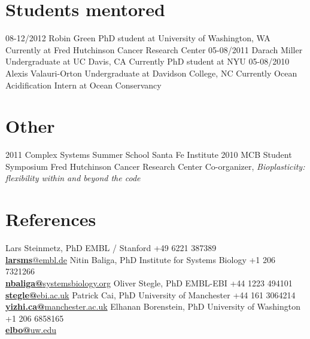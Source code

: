 \documentclass[]{friggeri-cv}
\begin{document}
\section{Students mentored}
\begin{entrylist}
  \entry
    {08-12/2012}
    {Robin Green}
    {PhD student at University of Washington, WA}
    {Currently at Fred Hutchinson Cancer Research Center}
  \entry
    {05-08/2011}
    {Darach Miller}
    {Undergraduate at UC Davis, CA}
    {Currently PhD student at NYU}
  \entry
    {05-08/2010}
    {Alexis Valauri-Orton}
    {Undergraduate at Davidson College, NC}
    {Currently ‎Ocean Acidification Intern at Ocean Conservancy}
\end{entrylist}

\section{Other}
\begin{entrylist}
 \entry
    {2011}
    {Complex Systems Summer School}
    {Santa Fe Institute}
    {}
  \entry
    {2010}
    {MCB Student Symposium}
    {Fred Hutchinson Cancer Research Center}
    {Co-organizer, \emph{Bioplasticity: flexibility within and beyond the code}}
\end{entrylist}
\newpage
\section{References}
\begin{entrylist}
\entry
    {}
    {Lars Steinmetz, PhD}
    {EMBL / Stanford}
    {+49 6221 387389\\
    \href{mailto:larsms@embl.de}{\textbf{larsms}@embl.de}}
    \entry
    {}
    {Nitin Baliga, PhD}
    {Institute for Systems Biology}
    {+1 206 7321266\\
    \href{mailto:nbaliga@systemsbiology.org}{\textbf{nbaliga@}systemsbiology.org}}
     \entry
    {}
    {Oliver Stegle, PhD}
    {EMBL-EBI}
    {+44 1223 494101\\
    \href{mailto:stegle@ebi.ac.uk}{\textbf{stegle@}ebi.ac.uk}}
     \entry
     {}
    {Patrick Cai, PhD}
    {University of Manchester}
    {+44 161 3064214\\
    \href{mailto:yizhi.ca@manchester.ac.uk}{\textbf{yizhi.ca@}manchester.ac.uk}}
     \entry
    {}
    {Elhanan Borenstein, PhD}
    {University of Washington}
    {+1 206 6858165\\
    \href{mailto:elbo@uw.edu}{\textbf{elbo@}uw.edu}}
\end{entrylist}
\end{document}
